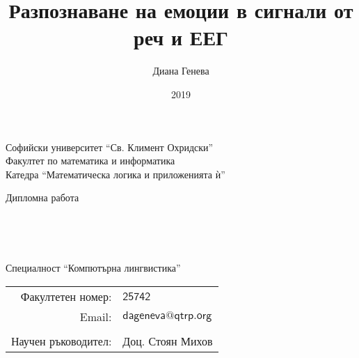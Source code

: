 \documentclass[12pt]{report}
\title{Разпознаване на емоции в сигнали от реч и ЕЕГ}
\author{Диана Генева}
\date{2019}
\makeatletter
\numberwithin{equation}{section}
\numberwithin{figure}{section}
\newcommand{\theemail}{dageneva@qtrp.org}
\makeatother
\begin{document}
\begin{center}
    Софийски университет ``Св. Климент Охридски'' \\
    Факултет по математика и информатика \\
    Катедра ``Математическа логика и приложенията ѝ''
    \vspace{4cm}

    {\LARGE Дипломна работа} \\

    \vspace{1cm}

    {\huge \thetitle} \\

    \vspace{2cm}

    {\LARGE \theauthor} \\

    \vspace{15mm}

    {\large Специалност ``Компютърна лингвистика''} \\

    \vspace{3mm}

    \begin{tabular}{r l}
        Факултетен номер: & $\mathsf{25742}$ \\
        Email: & $\mathsf{\theemail}$ \\

    \vspace{1cm} \\
        \large Научен ръководител: & \large Доц. Стоян Михов \\
    \end{tabular}

    \vspace{4cm}

    {\large \thedate}
\end{center}
\thispagestyle{empty}

\pagebreak
\hypersetup{linkcolor=black}
\tableofcontents
\pagebreak
\hypersetup{
    colorlinks=true,
    linktoc=all,
    citecolor=Greenish,
    filecolor=black,
    linkcolor=Bluish,
    urlcolor=Greenish
}

\end{document}
